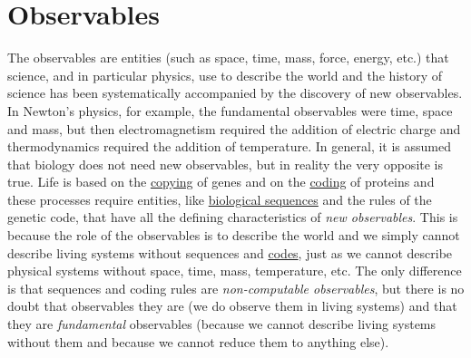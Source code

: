 \documentclass[12pt]{article}
\begin{document}
\section{Observables}
The observables are entities (such as space, time, mass, force, energy, etc.) that science, and in particular physics, use to describe the world and the history of science has been systematically accompanied by the discovery of new observables. In Newton's physics, for example, the fundamental observables were time, space and mass, but then electromagnetism required the addition of electric charge and thermodynamics required the addition of temperature. In general, it is assumed that biology does not need new observables, but in reality the very opposite is true. Life is based on the \hyperlink{copying_and_coding}{copying} of genes and on the \hyperlink{copying_and_coding}{coding} of proteins and these processes require entities, like \hyperlink{sequences}{biological sequences} and the rules of the genetic code, that have all the defining characteristics of \textit{new observables}. This is because the role of the observables is to describe the world and we simply cannot describe living systems without sequences and \hyperlink{code}{codes}, just as we cannot describe physical systems without space, time, mass, temperature, etc. The only difference is that sequences and coding rules are \textit{non-computable observables}, but there is no doubt that observables they are (we do observe them in living systems) and that they are \textit{fundamental} observables (because we cannot describe living systems without them and because we cannot reduce them to anything else). 


\hypertarget{organic_codes}{}
\end{document}
